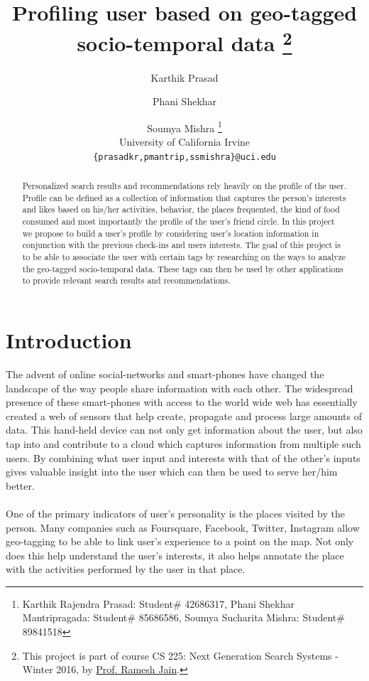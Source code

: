 \documentclass[12pt,letterpaper]{article}
\title{Profiling user based on geo-tagged\\socio-temporal data
	\footnote{This project is part of course CS 225: Next Generation Search Systems - Winter 2016, by \href{https://ngs.ics.uci.edu/}{Prof. Ramesh Jain}.}
}
\author{
Karthik Prasad\and Phani Shekhar\and Soumya Mishra
\vspace{2mm}
\footnote{Karthik Rajendra Prasad: Student\# 42686317, Phani Shekhar Mantripragada: Student\# 85686586, Soumya Sucharita Mishra: Student\# 89841518}\\
  University of California Irvine\\
  \texttt{\{prasadkr,pmantrip,ssmishra\}@uci.edu}
}
\date{}
\begin{document}
\maketitle

\begin{abstract}
\noindent
Personalized search results and recommendations rely heavily on the profile of the user. Profile can be defined as a collection of information that captures the person's interests and likes based on his/her activities, behavior, the places frequented, the kind of food consumed and most importantly the profile of the user's friend circle. In this project we propose to build a user's profile by considering user's location information in conjunction with the previous check-ins and users interests. The goal of this project is to be able to associate the user with certain tags by researching on the ways to analyze the geo-tagged socio-temporal data. These tags can then be used by other applications to provide relevant search results and recommendations.
\end{abstract}

\section{Introduction}
The advent of online social-networks and smart-phones have changed the landscape of the way people share information with each other. The widespread presence of these smart-phones with access to the world wide web has essentially created a web of sensors that help create, propagate and process large amounts of data. This hand-held device can not only get information about the user, but also tap into and contribute to a cloud which captures information from multiple such users. By combining what user input and interests with that of the other’s inputs gives valuable insight into the user which can then be used to serve her/him better.
\\\\
One of the primary indicators of user’s personality is the places visited by the person. Many companies such as Foursquare, Facebook, Twitter, Instagram allow geo-tagging to be able to link user’s experience to a point on the map. Not only does this help understand the user’s interests, it also helps annotate the place with the activities performed by the user in that place.
\end{document}
